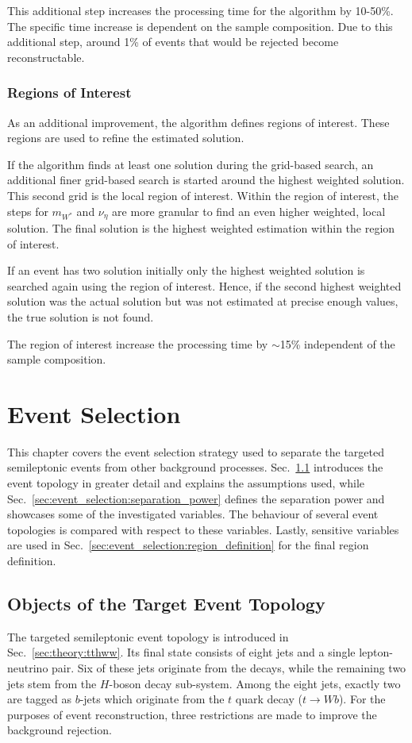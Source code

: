 \documentclass[bachelor,ngerman,english]{GAUBM}
\begin{document}
This additional step increases the processing time for the \NW algorithm by 10-50\%. The specific time increase is dependent on the sample composition. Due to this additional step, around 1\% of events that would be rejected become reconstructable.

\subsection*{Regions of Interest}
As an additional improvement, the \NW algorithm defines regions of interest. These regions are used to refine the estimated solution. 

If the algorithm finds at least one solution during the grid-based search, an additional finer grid-based search is started around the highest weighted solution. This second grid is the local region of interest. Within the region of interest, the steps for $m_{W^*}$ and $\nu_\eta$ are more granular to find an even higher weighted, local solution. The final solution is the highest weighted estimation within the region of interest. 

If an event has two solution initially only the highest weighted solution is searched again using the region of interest. Hence, if the second highest weighted solution was the actual solution but was not estimated at precise enough values, the true solution is not found. 

The region of interest increase the processing time by $\sim$15\% independent of the sample composition.



\chapter{Event Selection}
\label{ch:event_selection}
This chapter covers the event selection strategy used to separate the targeted semileptonic \ttHWW events from other background processes. Sec.~\ref{sec:event_selection:objects_of_target} introduces the event topology in greater detail and explains the assumptions used, while Sec.~\ref{sec:event_selection:separation_power} defines the separation power and showcases some of the investigated variables. The behaviour of several event topologies is compared with respect to these variables. Lastly, sensitive variables are used in Sec.~\ref{sec:event_selection:region_definition} for the final region definition.  

\section{Objects of the Target Event Topology}
\label{sec:event_selection:objects_of_target}
The targeted semileptonic \ttHWW event topology is introduced in Sec.~\ref{sec:theory:tthww}. Its final state consists of eight jets and a single lepton-neutrino pair. Six of these jets originate from the \ttbar decays, while the remaining two jets stem from the $H$-boson decay sub-system. Among the eight jets, exactly two are tagged as $b$-jets which originate from the $t$ quark decay ($t \rightarrow Wb$). For the purposes of event reconstruction, three restrictions are made to improve the background rejection. 
\end{document}

